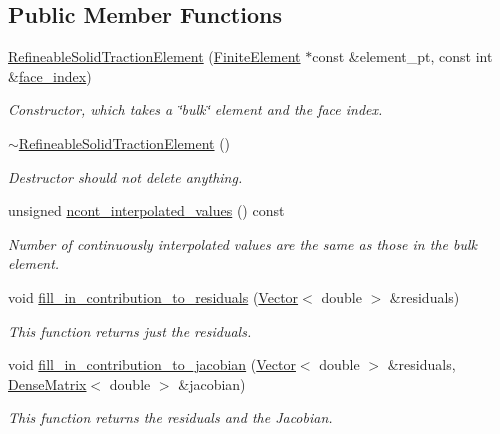 \subsection*{Public Member Functions}
\begin{DoxyCompactItemize}
\item 
\hyperlink{classoomph_1_1RefineableSolidTractionElement_a46b3cbd28e9a4eb8cc24e000250e3639}{Refineable\+Solid\+Traction\+Element} (\hyperlink{classoomph_1_1FiniteElement}{Finite\+Element} $\ast$const \&element\+\_\+pt, const int \&\hyperlink{classoomph_1_1FaceElement_a478d577ac6db67ecc80f1f02ae3ab170}{face\+\_\+index})
\begin{DoxyCompactList}\small\item\em Constructor, which takes a \char`\"{}bulk\char`\"{} element and the face index. \end{DoxyCompactList}\item 
\hyperlink{classoomph_1_1RefineableSolidTractionElement_a29953035bc2d3e0f0c5ca276c57a9fba}{$\sim$\+Refineable\+Solid\+Traction\+Element} ()
\begin{DoxyCompactList}\small\item\em Destructor should not delete anything. \end{DoxyCompactList}\item 
unsigned \hyperlink{classoomph_1_1RefineableSolidTractionElement_a9119a5b387cf3e5c3e3dee4dcabb08a3}{ncont\+\_\+interpolated\+\_\+values} () const
\begin{DoxyCompactList}\small\item\em Number of continuously interpolated values are the same as those in the bulk element. \end{DoxyCompactList}\item 
void \hyperlink{classoomph_1_1RefineableSolidTractionElement_a43a01cb9d3cb2bed34bc0fb811e5f830}{fill\+\_\+in\+\_\+contribution\+\_\+to\+\_\+residuals} (\hyperlink{classoomph_1_1Vector}{Vector}$<$ double $>$ \&residuals)
\begin{DoxyCompactList}\small\item\em This function returns just the residuals. \end{DoxyCompactList}\item 
void \hyperlink{classoomph_1_1RefineableSolidTractionElement_ad1921c9d88c2d71c0f3735259faaef35}{fill\+\_\+in\+\_\+contribution\+\_\+to\+\_\+jacobian} (\hyperlink{classoomph_1_1Vector}{Vector}$<$ double $>$ \&residuals, \hyperlink{classoomph_1_1DenseMatrix}{Dense\+Matrix}$<$ double $>$ \&jacobian)
\begin{DoxyCompactList}\small\item\em This function returns the residuals and the Jacobian. \end{DoxyCompactList}\end{DoxyCompactItemize}
